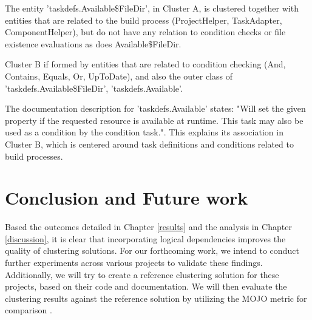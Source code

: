 \documentclass[conference]{IEEEtran}
\begin{document}
The entity 'taskdefs.Available\$FileDir', in Cluster A, is clustered together with entities that are related to the build process (ProjectHelper, TaskAdapter, ComponentHelper), but do not have any relation to condition checks or file existence evaluations as does Available\$FileDir. 

Cluster B if formed by entities that are related to condition checking (And, Contains, Equals, Or, UpToDate), and also the outer class of 'taskdefs.Available\$FileDir',  'taskdefs.Available'. 

 The documentation description for 'taskdefs.Available' states: "Will set the given property if the requested resource is available at runtime. This task may also be used as a condition by the condition task."\cite{ant_concat}.
 This explains its association in Cluster B, which is centered around task definitions and conditions related to build processes.



\section{Conclusion and Future work}

Based the outcomes detailed in Chapter \ref{results} and the analysis in Chapter \ref{discussion}, it is clear that incorporating logical dependencies improves the quality of clustering solutions. For our forthcoming work, we intend to conduct further experiments across various projects to validate these findings. Additionally, we will try to create a reference clustering solution for these projects, based on their code and documentation. We will then evaluate the clustering results against the reference solution by utilizing the MOJO metric for comparison \cite{mojo-tzerpos}.




\end{document}
